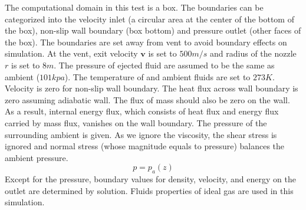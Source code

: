 \documentclass[review]{elsarticle}
\begin{document}
The computational domain in this test is a box. The boundaries can be categorized into the velocity inlet (a circular area at the center of the bottom of the box), non-slip wall boundary (box bottom) and pressure outlet (other faces of the box). The boundaries are set away from vent to avoid boundary effects on simulation.
At the vent, exit velocity $\textbf{v}$ is set to $500 m / s$ and radius of the nozzle $r$ is set to $8m $. The pressure of ejected fluid are assumed to be the same as ambient ($101 kpa$). The temperature of and ambient fluids are set to $273 K$. 
Velocity is zero for non-slip wall boundary. The heat flux across wall boundary is zero assuming adiabatic wall. The flux of mass should also be zero on the wall. As a result, internal energy flux, which consists of heat flux and energy flux carried by mass flux, vanishes on the wall boundary. 
The pressure of the surrounding ambient is given. As we ignore the viscosity, the shear stress is ignored and normal stress (whose magnitude equals to pressure) balances the ambient pressure.
\begin{equation}
p = p_a\left(z\right)  \label{eq:pressure_bc_p} 
\end{equation} 
Except for the pressure, boundary values for density, velocity, and energy on the outlet are determined by solution. Fluids properties of ideal gas are used in this simulation.
\end{document}

